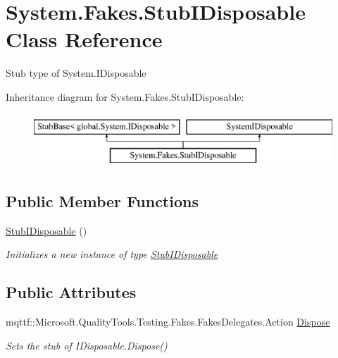 \hypertarget{class_system_1_1_fakes_1_1_stub_i_disposable}{\section{System.\-Fakes.\-Stub\-I\-Disposable Class Reference}
\label{class_system_1_1_fakes_1_1_stub_i_disposable}
}


Stub type of System.\-I\-Disposable 


Inheritance diagram for System.\-Fakes.\-Stub\-I\-Disposable\-:\begin{figure}[H]
\begin{center}
\leavevmode
\includegraphics[height=2.000000cm]{class_system_1_1_fakes_1_1_stub_i_disposable}
\end{center}
\end{figure}
\subsection*{Public Member Functions}
\begin{DoxyCompactItemize}
\item 
\hyperlink{class_system_1_1_fakes_1_1_stub_i_disposable_a8406b45e78788d7b4fddd40f8989916f}{Stub\-I\-Disposable} ()
\begin{DoxyCompactList}\small\item\em Initializes a new instance of type \hyperlink{class_system_1_1_fakes_1_1_stub_i_disposable}{Stub\-I\-Disposable}\end{DoxyCompactList}\end{DoxyCompactItemize}
\subsection*{Public Attributes}
\begin{DoxyCompactItemize}
\item 
mqttf\-::\-Microsoft.\-Quality\-Tools.\-Testing.\-Fakes.\-Fakes\-Delegates.\-Action \hyperlink{class_system_1_1_fakes_1_1_stub_i_disposable_a2cd5c65ace91166487da8740fd0f685f}{Dispose}
\begin{DoxyCompactList}\small\item\em Sets the stub of I\-Disposable.\-Dispose()\end{DoxyCompactList}\end{DoxyCompactItemize}


